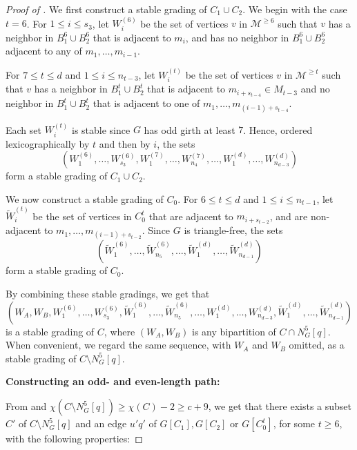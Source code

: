 \documentclass{article}
\begin{document}
\begin{proof}[Proof of ]
We first construct a stable grading of $C_1 \cup C_2$. We begin with the case \( t = 6 \).
For \(1 \leq i \leq s_{3}\), let \(W_i^{(6)}\) be the set of vertices \(v\) in \(\mathcal{M}^{\geq 6}\) such that \(v\) has a neighbor in \(B_1^6 \cup B_2^6\) that is adjacent to \(m_i\), and has no neighbor in \(B_1^6 \cup B_2^6\) adjacent to any of \(m_1, \dots, m_{i - 1}\).

For \(7 \leq t \leq d\) and \(1 \leq i \leq n_{t - 3}\), let \(W_i^{(t)}\) be the set of vertices \(v\) in \(\mathcal{M}^{\geq t}\) such that \(v\) has a neighbor in \(B_1^t \cup B_2^t\) that is adjacent to \(m_{i + s_{t - 4}} \in M_{t - 3}\) and no neighbor in \(B_1^t \cup B_2^t\) that is adjacent to one of \(m_1, \dots, m_{(i -1 ) + s_{t - 4}}\).

Each set $W_i^{(t)}$ is stable since \(G\) has odd girth at least \(7\). 
Hence, ordered lexicographically by \(t\) and then by \(i\), the sets
\[
\left(W_1^{(6)}, \dots, W_{s_{3}}^{(6)}, W_1^{(7)}, \dots, W_{n_4}^{(7)}, \dots, W^{(d)}_1, \dots, W^{(d)}_{n_{d - 3}}\right)
\]
form a stable grading of \(C_1 \cup C_2\).

We now construct a stable grading of \(C_0\).
For \(6 \leq t \leq d\) and \(1 \leq i \leq n_{t - 1}\),
let \(\widetilde{W}^{(t)}_i\) be the set of vertices in \(C_0^t\) that are adjacent to \(m_{i + s_{t - 2}}\), and are non-adjacent to \(m_1, \dots, m_{(i - 1) + s_{t - 2}}\). 
Since \(G\) is triangle-free, the sets
\[
\left(\widetilde{W}^{(6)}_1, \dots, \widetilde{W}_{n_5}^{(6)}, \dots, \widetilde{W}_{1}^{(d)}, \dots, \widetilde{W}_{n_{d - 1}}^{(d)}\right)
\]
form a stable grading of \( C_0 \).

By combining these stable gradings, we get that
\[
\left(W_A, W_B, W^{(6)}_1, \dots, W_{s_{3}}^{(6)}, \widetilde{W}^{(6)}_1, \dots, \widetilde{W}^{(6)}_{n_5}, \dots,  W_1^{(d)}, \dots, W_{n_{d - 3}}^{(d)}, \widetilde{W}_1^{(d)}, \dots, \widetilde{W}_{n_{d - 1}}^{(d)} \right)
\]
is a stable grading of $C$, where $(W_A, W_B)$ is any bipartition of $C \cap N_G^5[q]$. When convenient, we regard the same sequence, with \( W_A\) and \( W_B\) omitted, as a stable grading of \( C \setminus N^5_G[q]\).

\textbf{Constructing an odd- and even-length path:}

From  and $\chi(C \setminus N_G^5[q]) \geq \chi(C) - 2 \geq c + 9$, we get that there exists a subset $C'$ of $C \setminus N_G^5[q]$ and an edge $u'q'$ of $G[C_1], G[C_2]$ or $G[C_0^t]$, for some $t \geq 6$, with the following properties:


\end{proof}
\end{document}
